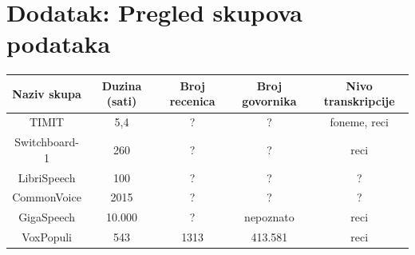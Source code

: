 \documentclass[a4paper]{article}
\begin{document}

\appendix
 
% 


\appendix

\newpage
\section{Dodatak: Pregled skupova podataka}
\label{sec:skupovi}

\begin{table}[h!]
\begin{center}
  \begin{tabular}{|c|c|c|c|c|}
    \hline
    Naziv skupa   & Duzina (sati) & Broj recenica & Broj govornika & Nivo transkripcije \\
    \hline
    TIMIT         & 5,4           & ?             & ?              & foneme, reci       \\ 
    Switchboard-1 & 260           & ?             & ?              & reci               \\ 
    LibriSpeech   & 100           & ?             & ?              & ?                  \\ 
    CommonVoice   & 2015          & ?             & ?              & ?                  \\
    GigaSpeech    & 10.000        & ?             & nepoznato      & reci               \\
    VoxPopuli     & 543           & 1313          & 413.581        & reci               \\
    \hline
  \end{tabular}
\end{center}
\end{table}
\end{document}
